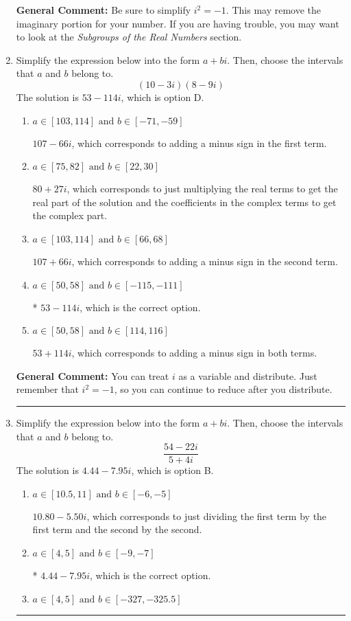 \documentclass{extbook}[14pt]
\newcommand{\litem}[1]{\item #1

\rule{\textwidth}{0.4pt}}
\begin{document}
\begin{enumerate}
{\textbf{General Comment:} Be sure to simplify $i^2 = -1$. This may remove the imaginary portion for your number. If you are having trouble, you may want to look at the \textit{Subgroups of the Real Numbers} section.
}
\litem{
Simplify the expression below into the form $a+bi$. Then, choose the intervals that $a$ and $b$ belong to.
\[ (10 - 3 i)(8 - 9 i) \]The solution is \( 53 - 114 i \), which is option D.\begin{enumerate}[label=\Alph*.]
\item \( a \in [103, 114] \text{ and } b \in [-71, -59] \)

 $107 - 66 i$, which corresponds to adding a minus sign in the first term.
\item \( a \in [75, 82] \text{ and } b \in [22, 30] \)

 $80 + 27 i$, which corresponds to just multiplying the real terms to get the real part of the solution and the coefficients in the complex terms to get the complex part.
\item \( a \in [103, 114] \text{ and } b \in [66, 68] \)

 $107 + 66 i$, which corresponds to adding a minus sign in the second term.
\item \( a \in [50, 58] \text{ and } b \in [-115, -111] \)

* $53 - 114 i$, which is the correct option.
\item \( a \in [50, 58] \text{ and } b \in [114, 116] \)

 $53 + 114 i$, which corresponds to adding a minus sign in both terms.
\end{enumerate}

\textbf{General Comment:} You can treat $i$ as a variable and distribute. Just remember that $i^2=-1$, so you can continue to reduce after you distribute.
}
\litem{
Simplify the expression below into the form $a+bi$. Then, choose the intervals that $a$ and $b$ belong to.
\[ \frac{54 - 22 i}{5 + 4 i} \]The solution is \( 4.44  - 7.95 i \), which is option B.\begin{enumerate}[label=\Alph*.]
\item \( a \in [10.5, 11] \text{ and } b \in [-6, -5] \)

 $10.80  - 5.50 i$, which corresponds to just dividing the first term by the first term and the second by the second.
\item \( a \in [4, 5] \text{ and } b \in [-9, -7] \)

* $4.44  - 7.95 i$, which is the correct option.
\item \( a \in [4, 5] \text{ and } b \in [-327, -325.5] \)


\end{enumerate}}
\end{enumerate}
\end{document}
